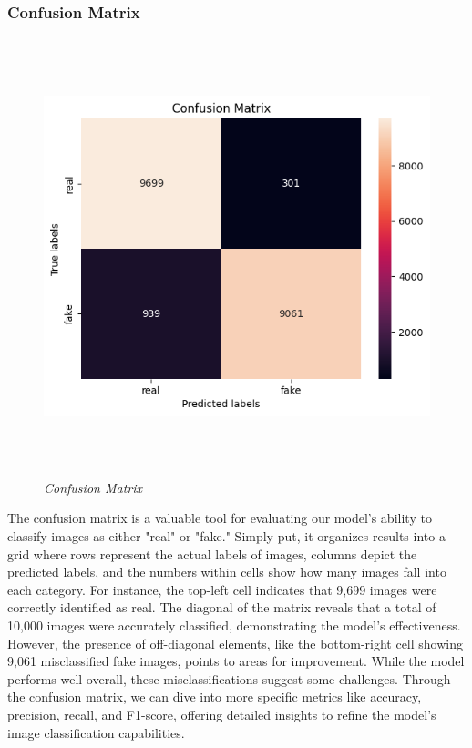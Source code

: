 \subsubsection{Confusion Matrix}
\begin{figure}[ht]
    \centering
    \includegraphics[width=5in, height =5in ]{img/confusionMatrixImage.png}
    \caption{\textit{Confusion Matrix }}
\end{figure}
The confusion matrix is a valuable tool for evaluating our model's ability to classify images as either "real" or "fake." Simply put, it organizes results into a grid where rows represent the actual labels of images, columns depict the predicted labels, and the numbers within cells show how many images fall into each category. For instance, the top-left cell indicates that 9,699 images were correctly identified as real. The diagonal of the matrix reveals that a total of 10,000 images were accurately classified, demonstrating the model's effectiveness. However, the presence of off-diagonal elements, like the bottom-right cell showing 9,061 misclassified fake images, points to areas for improvement. While the model performs well overall, these misclassifications suggest some challenges. Through the confusion matrix, we can dive into more specific metrics like accuracy, precision, recall, and F1-score, offering detailed insights to refine the model's image classification capabilities.
\newpage
